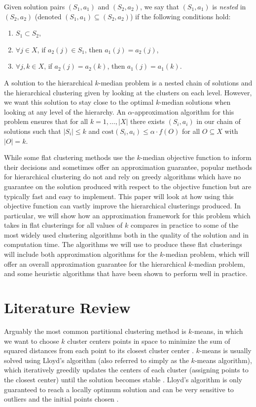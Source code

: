 \documentclass[conference, 10pt, final]{IEEEtran}
\begin{document}
Given solution pairs $(S_1, a_1)$ and $(S_2, a_2)$, we say that $(S_1, a_1)$ is \emph{nested} in $(S_2, a_2)$ (denoted $(S_1, a_1) \subseteq (S_2, a_2)$) if the following conditions hold:
\begin{enumerate}[\IEEEsetlabelwidth{3)}]
	\item $S_1 \subset S_2$, 
	\item $\forall  j \in X$, if $a_2(j) \in S_1$, then $a_1(j) = a_2(j)$, 
	\item $\forall j, k \in X$, if $a_2(j) = a_2(k)$, then $a_1(j) = a_1(k)$.
\end{enumerate}
A solution to the hierarchical $k$-median problem is a nested chain of solutions and the hierarchical clustering given by looking at the clusters on each level. However, we want this solution to stay close to the optimal $k$-median solutions when looking at any level of the hierarchy. An $\alpha$-approximation algorithm for this problem ensures that for all $k = 1, \ldots, |X|$ there exists $(S_i, a_i)$ in our chain of solutions such that $|S_i| \leq k$ and $\mathrm{cost}(S_i, a_i) \leq \alpha \cdot f(O)$ for all $O \subseteq X$ with $|O| = k$.

While some flat clustering methods use the $k$-median objective function to inform their decisions and sometimes offer an approximation guarantee, popular methods for hierarchical clustering do not and rely on greedy algorithms which have no guarantee on the solution produced with respect to the objective function but are typically fast and easy to implement. This paper will look at how using this objective function can vastly improve the hierarchical clusterings produced. 
In particular, we will show how an approximation framework for this problem which takes in flat clusterings for all values of $k$ compares in practice to some of the most widely used clustering algorithms both in the quality of the solution and in computation time. The algorithms we will use to produce these flat clusterings will include both approximation algorithms for the $k$-median problem, which will offer an overall approximation guarantee for the hierarchical $k$-median problem, and some heuristic algorithms that have been shown to perform well in practice. 

\section{Literature Review}

Arguably the most common partitional clustering method is $k$-means, in which we want to choose $k$ cluster centers points in space to minimize the sum of squared distances from each point to its closest cluster center \cite{Jain}.  $k$-means is usually solved using Lloyd's algorithm (also referred to simply as the $k$-means algorithm), which iteratively greedily updates the centers of each cluster (assigning points to the closest center) until the solution becomes stable \cite{Jain}. Lloyd's algorithm is only guaranteed to reach a locally optimum solution and can be very sensitive to outliers and the initial points chosen \cite{Kanungo}.
\end{document}
